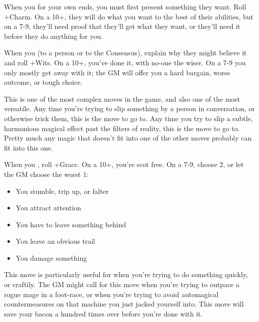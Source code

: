 \begin{multicols}{3}
  \SEPARATOR

  \begin{move}
    When you  for your own ends, you must first
    present something they want. Roll +Charm. On a 10+, they will do
    what you want to the best of their abilities, but on a 7-9,
    they'll need proof that they'll get what they want, or they'll
    need it before they do anything for you.
  \end{move}

  \columnbreak
    
  \begin{move}
    When you  (to a person or to the Consensus),
    explain why they might believe it and roll +Wits. On a 10+, you've
    done it, with no-one the wiser. On a 7-9 you only mostly get away
    with it; the GM will offer you a hard bargain, worse outcome, or
    tough choice.
\begin{movedetail}
  This is one of the most complex moves in the game, and also one of
  the most versatile. Any time you're trying to slip something by a
  person in conversation, or otherwise trick them, this is the move to
  go to. Any time you try to slip a subtle, harmonious magical
  effect past the filters of reality, this is the move to go
  to. Pretty much any magic that doesn't fit into one of the other
  moves probably can fit into this one.
\end{movedetail}
  \end{move}

  \vspace{1em}
  
  \SEPARATOR

  \begin{move}
    When you , roll
    +Grace. On a 10+, you're scot free. On a 7-9, choose 2, or let
    the GM choose the worst 1:
    \begin{itemize}
      \setlength\itemsep{0em}
    \item You stumble, trip up, or falter
    \item You attract attention
    \item You have to leave something behind
    \item You leave an obvious trail
    \item You damage something
    \end{itemize}
\begin{movedetail}
  This move is particularly useful for when you're trying to do
  something quickly, or craftily. The GM might call for this move when
  you're trying to outpace a rogue mage in a foot-race, or when you're
  trying to avoid automagical countermeasures on that machine you just
  jacked yourself into. This move will save your bacon a hundred times
  over before you're done with it.
\end{movedetail}
  \end{move}


\end{multicols}
